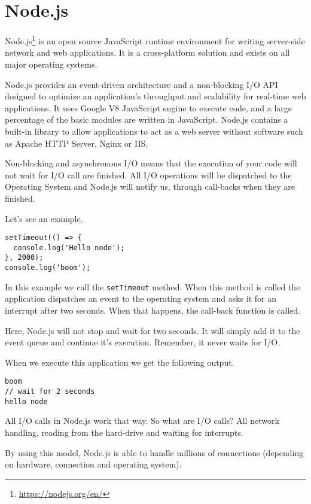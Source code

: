 \section{Node.js}\label{sec:nodejs}
Node.js\footnote{\url{https://nodejs.org/en/}} is an open source JavaScript runtime environment for writing server-side network and web applications. It is a cross-platform solution and exists on all major operating systems.

Node.js provides an event-driven architecture and a non-blocking I/O API designed to optimize an application's throughput and scalability for real-time web applications. It uses Google V8 JavaScript engine to execute code, and a large percentage of the basic modules are written in JavaScript. Node.js contains a built-in library to allow applications to act as a web server without software such as Apache HTTP Server, Nginx or IIS.

Non-blocking and asynchronous I/O means that the execution of your code will not wait for I/O call are finished. All I/O operations will be dispatched to the Operating System and Node.js will notify us, through call-backs when they are finished.

Let's see an example.

\begin{lstlisting}
setTimeout(() => {
  console.log('Hello node');
}, 2000);
console.log('boom');
\end{lstlisting}

In this example we call the \texttt{setTimeout} method. When this method is called the application dispatches an event to the operating system and asks it for an interrupt after two seconds. When that happens, the call-back function is called.

Here, Node.js will not stop and wait for two seconds. It will simply add it to the event queue and continue it's execution. Remember, it never waits for I/O.

When we execute this application we get the following output.
\begin{lstlisting}
boom
// wait for 2 seconds
hello node
\end{lstlisting}

All I/O calls in Node.js work that way. So what are I/O calls? All network handling, reading from the hard-drive and waiting for interrupts.

By using this model, Node.js is able to handle millions of connections (depending on hardware, connection and operating system).

